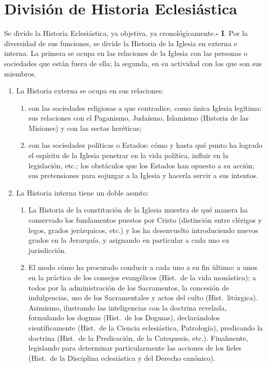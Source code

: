 \raggedbottom{} \documentclass[12pt, a4paper]{book}
\begin{document}
\section{División de Historia Eclesiástica}
Se divide la Historia Eclesiástica, ya objetiva, ya cronológicamente.\textbf{- I}. Por la diversidad de sus funciones, se divide la Historia
de la Iglesia en externa e interna. La primera se ocupa en las relaciones de la Iglesia con las personas o sociedades que están fuera de ella; la segunda, en su actividad con los que son sus miembros.
\begin{enumerate}
  \item La Historia externa se ocupa en sus relaciones: \begin{enumerate}
    \item con las sociedades religiosas a que contradice, como única Iglesia legítima: sus relaciones con el Paganismo, Judaísmo, Islamismo (Historia de las Misiones) y con las sectas heréticas;
    \item con las sociedades políticas o Estados: cómo y hasta qué punto ha logrado el espíritu de la Iglesia penetrar en la vida política, influir en la legislación, etc.; los obstáculos que los Estados han opuesto a su acción; sus pretensiones para sojuzgar a la Iglesia y hacerla servir a sus intentos.
  \end{enumerate}
  \item La Historia interna tiene un doble asunto: \begin{enumerate}
    \item La Historia de la constitución de la Iglesia muestra de qué manera ha conservado los fundamentos puestos por Cristo (distinción entre clérigos y legos, grados jerárquicos, etc.) y los ha desenvuelto introduciendo nuevos grados en la Jerarquía, y asignando en particular a cada uno su jurisdicción.
    \item El modo cómo ha procurado conducir a cada uno a su fin último: a unos en la práctica de los consejos evangélicos (Hist.\ de la vida monástica); a todos por la administración de los Sacramentos, la concesión de indulgencias, uso de los Sacramentales y actos del culto (Hist.\ litúrgica). Asimismo, ilustrando las inteligencias con la doctrina revelada, formulando los dogmas (Hist.\ de los Dogmas), declarándolos científicamente (Hist.\ de la Ciencia eclesiástica, Patrología), predicando la doctrina (Hist.\ de la Predicación, de la Catequesis, etc.). Finalmente, legislando para determinar particularmente las acciones de los fieles (Hist.\ de la Disciplina eclesiástica y del Derecho canónico).

  \end{enumerate}
\end{enumerate}
\end{document}
